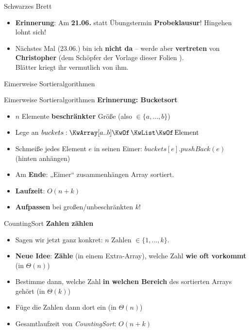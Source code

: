 





	

\begin{frame}{Schwarzes Brett}
	\begin{itemize}
		\item \textbf{Erinnerung}: Am \textbf{21.06.} statt Übungstermin \textbf{Probeklausur}! Hingehen lohnt sich!
		\item Nächstes Mal (23.06.) bin ich \textbf{nicht da} – werde aber \textbf{vertreten} von \textbf{Christopher} (dem Schöpfer der Vorlage dieser Folien \smiley). \\
		Blätter kriegt ihr vermutlich von ihm.
	\end{itemize}
\end{frame}
	
\begin{headframe}
	Eimerweise Sortieralgorithmen
\end{headframe}
	
\begin{frame}{Eimerweise Sortieralgorithmen}
	\textbf{Erinnerung: Bucketsort} 
	\begin{itemize}
		\item $n$ Elemente \textbf{beschränkter} Größe (also $\in \{a, ..., b\} $)
		\item Lege an $buckets: \KwArray[a..b] \KwOf \KwListOf \|Element|$ 
		\item Schmeiße jedes Element $e$ in seinen Eimer: $buckets[e].pushBack(e)$ (hinten anhängen)
		\item Am \textbf{Ende}: „Eimer“ zusammenhängen
		\implitem Array sortiert. 
		\item \textbf{Laufzeit}: $O(n+k)$
		\item \textbf{Aufpassen} bei großen/unbeschränkten $k$!
	\end{itemize}
\end{frame}

\begin{frame}{CountingSort}
	\textbf{Zahlen zählen} 
	\begin{itemize}
		\item Sagen wir jetzt ganz konkret: $n$ Zahlen $\in \{1,...,k\}$.
		\pause
		\item \textbf{Neue Idee}: \textbf{Zähle} (in einem Extra-Array), welche Zahl \textbf{wie oft vorkommt} (in $\Theta(n)$)
		\pause
		\item Bestimme dann, welche Zahl \textbf{in welchen Bereich} des sortierten Arrays gehört (in $\Theta(k)$)
		\pause
		\item Füge die Zahlen dann dort ein (in $\Theta(n)$)
		\pause
		\item Gesamtlaufzeit von \emph{CountingSort}: $O(n + k)$
	\end{itemize}
\end{frame}

